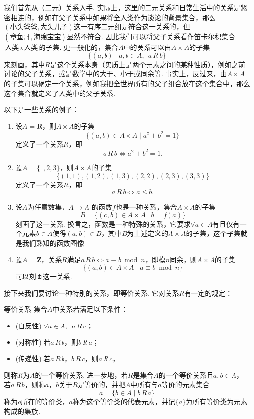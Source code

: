 我们首先从（二元）关系入手. 实际上，这里的二元关系和日常生活中的关系是紧密相连的，例如在父子关系中如果将全人类作为谈论的背景集合，那么$(\text{小头爸爸}, \text{大头儿子})$这一有序二元组是符合这一关系的，但$(\text{章鱼哥}, \text{海绵宝宝})$显然不符合. 因此我们可以将父子关系看作笛卡尔积集合$\text{人类}\times\text{人类}$的子集. 更一般化的，集合$A$中的关系可以由$A\times A$的子集
\[\{(a,b) \mid a,b\in A, \enspace a\,R\,b\}\]
来刻画，其中$R$是这个关系本身（实质上是两个元素之间的某种性质），例如之前讨论的父子关系，或是数学中的大于、小于或同余等. 事实上，反过来，由$A\times A$的子集可以确定一个关系，例如我把全世界所有的父子组合放在这个集合中，那么这个集合就定义了人类中的父子关系.
\begin{example}{}{}
    以下是一些关系的例子：
    \begin{enumerate}
        \item 设$A=\mathbf{R}$，则$A\times A$的子集
              \[\{(a,b)\in A\times A \mid a^2+b^2=1\}\]
              定义了一个关系$R$，即
              \[a\,R\,b \iff a^2+b^2=1.\]

        \item 设$A=\{1,2,3\}$，则$A\times A$的子集
              \[\{(1,1),(1,2),(1,3),(2,2),(2,3),(3,3)\}\]
              定义了一个关系$R$，即
              \[a\,R\,b \iff a\leqslant b.\]

        \item 设$A$为任意数集，$A\to A$ 的函数$f$也是一种关系，集合$A\times A$的子集
              \[B=\{(a,b)\in A\times A \mid b=f(a)\}\]
              刻画了这一关系. 换言之，函数是一种特殊的关系，它要求$\forall a\in A$有且仅有一个元素$b\in A$使得$(a,b)\in B$，其中$B$为上述定义的$A\times A$的子集，这个子集就是我们熟知的函数图像.

        \item 设$A=\mathbf{Z}$，关系$R$满足$a\,R\,b\iff a\equiv b \bmod n$，即模$n$同余，则$A\times A$的子集
              \[\{(a,b)\in A\times A \mid a\equiv b \bmod n\}\]
              可以刻画这一关系.
    \end{enumerate}
\end{example}

接下来我们要讨论一种特别的关系，即等价关系. 它对关系$R$有一定的规定：
\begin{definition}{}{等价关系}
    集合$A$中关系若满足以下条件：
    \begin{itemize}
        \item (自反性) $\forall a\in A, \enspace a\,R\,a$；

        \item (对称性) 若$a\,R\,b$，则$b\,R\,a$；

        \item (传递性) 若$a\,R\,b$，$b\,R\,c$，则$a\,R\,c$，
    \end{itemize}
    则称$R$为$A$的一个等价关系. 进一步地，若$R$是集合$A$的一个等价关系且$a,b\in A$，若$a\,R\,b$，则称$a$，$b$关于$R$是等价的，并把$A$中所有与$a$等价的元素集合
    \[\overline{a}=\{b\in A \mid b\,R\,a\}\]
    称为$a$所在的等价类，$a$称为这个等价类的代表元素，并记$\{\overline{a}\}$为所有等价类为元素构成的集族.
\end{definition}

